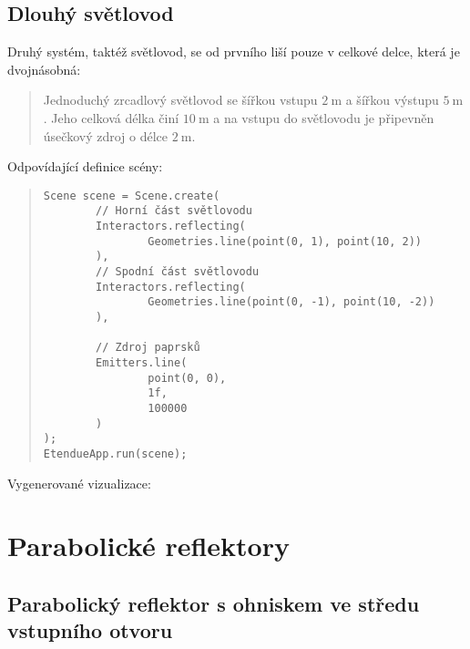 \subsection{Dlouhý světlovod}

Druhý systém, taktéž světlovod, se od prvního liší pouze v celkové delce, která je dvojnásobná:

\begin{quote}
    Jednoduchý zrcadlový světlovod se šířkou vstupu $2\ \mathrm{m}$ a šířkou výstupu $5\ \mathrm{m}$. Jeho celková délka činí $10\ \mathrm{m}$ a na vstupu do světlovodu je připevněn úsečkový zdroj o délce $2\ \mathrm{m}$.
\end{quote}

Odpovídající definice scény:

\begin{minipage}{\textwidth}\begin{quote}\begin{lstlisting}
Scene scene = Scene.create(
        // Horní část světlovodu
        Interactors.reflecting(
                Geometries.line(point(0, 1), point(10, 2))
        ),
        // Spodní část světlovodu
        Interactors.reflecting(
                Geometries.line(point(0, -1), point(10, -2))
        ),

        // Zdroj paprsků
        Emitters.line(
                point(0, 0),
                1f,
                100000
        )
);
EtendueApp.run(scene);
\end{lstlisting}\end{quote}\end{minipage}

Vygenerované vizualizace:




\section{Parabolické reflektory}

\subsection{Parabolický reflektor s ohniskem ve středu vstupního otvoru}

